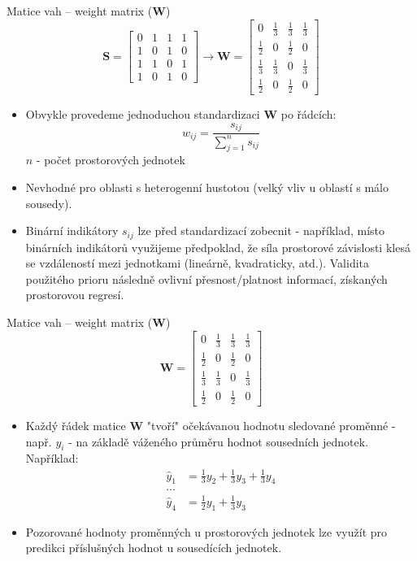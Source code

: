 \documentclass{beamer}
\begin{document}
\begin{frame}{Matice vah – weight matrix ($\bm{W}$)}
\vspace{-0.5cm}
$$
\bm{S} = \begin{bmatrix}
0 & 1 & 1 & 1 \\
1 & 0 & 1 & 0 \\
1 & 1 & 0 & 1 \\
1 & 0 & 1 & 0
\end{bmatrix}\rightarrow 
\bm{W}=
\begin{bmatrix}
0 & \tfrac{1}{3} & \tfrac{1}{3} & \tfrac{1}{3} \\[2pt]
\tfrac{1}{2} & 0 & \tfrac{1}{2} & 0 \\[2pt]
\tfrac{1}{3} & \tfrac{1}{3} & 0 & \tfrac{1}{3} \\[2pt]
\tfrac{1}{2} & 0 & \tfrac{1}{2} & 0
\end{bmatrix}
$$
\begin{itemize}
	\item Obvykle provedeme jednoduchou standardizaci $\bm{W}$ po řádcích: 
	$$ w_{ij} = \frac{s_{ij}}{\sum^n_{j=1} s_{ij}}$$
	$n$ - počet prostorových jednotek
	\item Nevhodné pro oblasti s heterogenní hustotou (velký vliv u oblastí s málo sousedy). 
	\item Binární indikátory $s_{ij}$ lze před standardizací zobecnit - například, místo binárních indikátorů využijeme předpoklad, že síla prostorové závislosti klesá se vzdáleností mezi jednotkami (lineárně, kvadraticky, atd.). Validita použitého prioru následně ovlivní přesnost/platnost informací, získaných prostorovou regresí.
\end{itemize}
\end{frame}
\begin{frame}{Matice vah – weight matrix ($\bm{W}$)}
$$
\bm{W}=
\begin{bmatrix}
0 & \tfrac{1}{3} & \tfrac{1}{3} & \tfrac{1}{3} \\[2pt]
\tfrac{1}{2} & 0 & \tfrac{1}{2} & 0 \\[2pt]
\tfrac{1}{3} & \tfrac{1}{3} & 0 & \tfrac{1}{3} \\[2pt]
\tfrac{1}{2} & 0 & \tfrac{1}{2} & 0
\end{bmatrix}
$$
\begin{itemize}
	\item Každý řádek matice $\bm{W}$ "tvoří" očekávanou hodnotu sledované proměnné - např. $y_i$ - na základě váženého průměru hodnot sousedních jednotek. Například:
	\begin{align*}
	\hat{y}_1 & =  \tfrac{1}{3} y_2 + \tfrac{1}{3} y_3 + \tfrac{1}{3} y_4 \\
	\dots \\
	\hat{y}_4 & = \tfrac{1}{2} y_1  + \tfrac{1}{3} y_3 
	\end{align*}
	\item Pozorované hodnoty proměnných u prostorových jednotek lze využít pro predikci příslušných hodnot u sousedících jednotek.
\end{itemize}
\end{frame}
\end{document}
